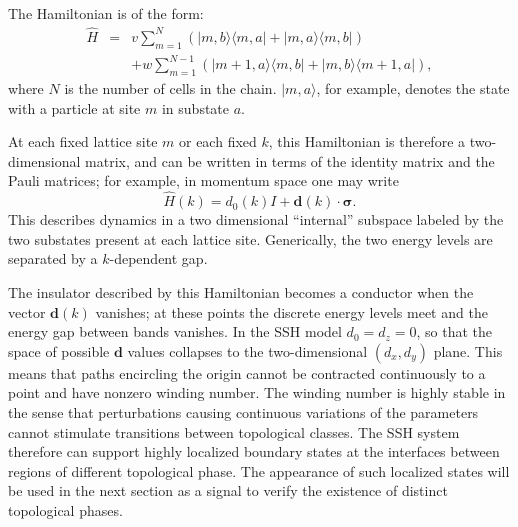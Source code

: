 \documentclass[twocolumn,amsmath, amssymb, superscriptaddress, pra]{revtex4}
\begin{document}
The Hamiltonian is of the form:
\begin{eqnarray}\hat H &=& v \sum_{m=1}^N \left( |m,b\rangle \langle m,a| +  |m,a\rangle \langle m,b|  \right)\label{sshhamiltonian} \\
& & + w\sum_{m=1}^{N-1} \left( |m+1,a\rangle \langle m,b| +  |m,b\rangle \langle m+1,a|  \right) ,\nonumber\end{eqnarray} where $N$ is the number of cells in the
chain. $|m,a\rangle$, for example, denotes the state with a particle at site $m$ in substate $a$.


At each fixed lattice site $m$ or each fixed $k$, this Hamiltonian is therefore a two-dimensional matrix, and can be written in terms of the identity matrix and
the Pauli matrices; for example, in momentum space one may write
\begin{equation}\hat H(k) =
d_0(k) I +\bm d(k)\cdot \bm\sigma .\label{Handd}\end{equation}
This describes dynamics in a two dimensional ``internal'' subspace labeled by the two substates present at each lattice site. Generically, the two energy levels
are separated by a $k$-dependent gap.

The insulator described by this Hamiltonian becomes a conductor when the
vector $\bm d(k)$ vanishes; at these points the discrete energy levels meet
and the energy gap between bands vanishes.  In the SSH model $d_0=d_z=0$, so
that the space of possible $\bm d$ values collapses to the two-dimensional
$(d_x,d_y)$ plane. This means that paths encircling the origin cannot be
contracted continuously to a point and have nonzero winding number.  The
winding number is highly stable in the sense that perturbations causing
continuous variations of the parameters cannot stimulate transitions between
topological classes. The SSH system therefore can support highly localized
boundary states at the interfaces between regions of different topological
phase. The appearance of such localized states will be used in the next
section as a signal to verify the existence of distinct topological phases.
\end{document}
